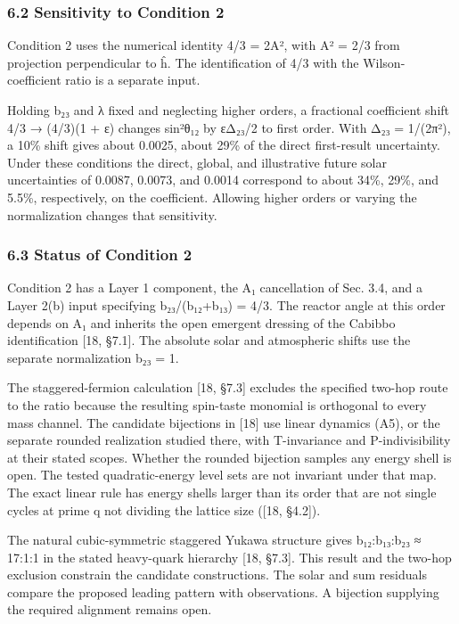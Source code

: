 \documentclass[
]{article}
\begin{document}
\hypertarget{sensitivity-to-condition-2}{%
\subsubsection{6.2 Sensitivity to Condition
2}\label{sensitivity-to-condition-2}}

Condition 2 uses the numerical identity 4/3 = 2A², with A² = 2/3 from
projection perpendicular to ĥ. The identification of 4/3 with the
Wilson-coefficient ratio is a separate input.

Holding b₂₃ and λ fixed and neglecting higher orders, a fractional
coefficient shift 4/3 → (4/3)(1 + ε) changes sin²θ₁₂ by εΔ₂₃/2 to first
order. With Δ₂₃ = 1/(2π²), a 10\% shift gives about 0.0025, about 29\%
of the direct first-result uncertainty. Under these conditions the
direct, global, and illustrative future solar uncertainties of 0.0087,
0.0073, and 0.0014 correspond to about 34\%, 29\%, and 5.5\%,
respectively, on the coefficient. Allowing higher orders or varying the
normalization changes that sensitivity.

\hypertarget{status-of-condition-2}{%
\subsubsection{6.3 Status of Condition 2}\label{status-of-condition-2}}

Condition 2 has a Layer 1 component, the A₁ cancellation of Sec. 3.4,
and a Layer 2(b) input specifying b₂₃/(b₁₂+b₁₃) = 4/3. The reactor angle
at this order depends on A₁ and inherits the open emergent dressing of
the Cabibbo identification {[}18, §7.1{]}. The absolute solar and
atmospheric shifts use the separate normalization b₂₃ = 1.

The staggered-fermion calculation {[}18, §7.3{]} excludes the specified
two-hop route to the ratio because the resulting spin-taste monomial is
orthogonal to every mass channel. The candidate bijections in {[}18{]}
use linear dynamics (A5), or the separate rounded realization studied
there, with T-invariance and P-indivisibility at their stated scopes.
Whether the rounded bijection samples any energy shell is open. The
tested quadratic-energy level sets are not invariant under that map. The
exact linear rule has energy shells larger than its order that are not
single cycles at prime q not dividing the lattice size ({[}18, §4.2{]}).

The natural cubic-symmetric staggered Yukawa structure gives b₁₂:b₁₃:b₂₃
≈ 17:1:1 in the stated heavy-quark hierarchy {[}18, §7.3{]}. This result
and the two-hop exclusion constrain the candidate constructions. The
solar and sum residuals compare the proposed leading pattern with
observations. A bijection supplying the required alignment remains open.
\end{document}
